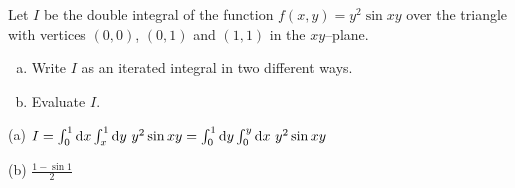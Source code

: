 \begin{question}[M200 2009A] %
Let $I$ be the double integral of the function $f(x,y) = y^2 \sin xy$ 
over the triangle with vertices $(0, 0)$, $(0, 1)$ and $(1, 1)$ 
in the $xy$--plane.

\begin{enumerate}[(a)]
\item
Write $I$ as an iterated integral in two different ways.

\item 
Evaluate $I$.

\end{enumerate}
\end{question}

%

\begin{answer}
(a) $I=\int_0^1\dee{x}\int_x^1\dee{y}\ y^2\sin xy  
           =\int_0^1\dee{y}\int_0^y\dee{x}\ y^2\sin xy$

(b) $\frac{1-\sin 1}{2}$
\end{answer}

